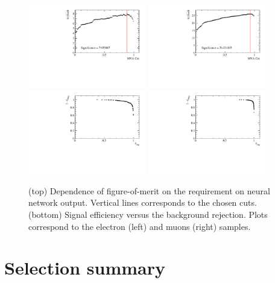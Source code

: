\begin{figure}[h!]
\centering
\includegraphics[width=0.46\textwidth]{RKst/figs/Training/EE_FoM.pdf}
\includegraphics[width=0.46\textwidth]{RKst/figs/Training/MM_FoM.pdf}
\includegraphics[width=0.46\textwidth]{RKst/figs/Training/EE_ROC.pdf}
\includegraphics[width=0.46\textwidth]{RKst/figs/Training/MM_ROC.pdf}
\caption{(top) Dependence of figure-of-merit on the requirement on neural network output.
Vertical lines corresponds to the chosen cuts. (bottom) Signal efficiency versus the 
background rejection. Plots correspond to the electron (left) and muons (right) samples.}
\label{fig:RKst_FOM}
\end{figure}

\section{Selection summary}

